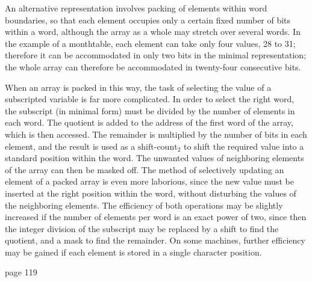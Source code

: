 An alternative representation involves packing of elements within word boundaries, so that each element occupies only a certain fixed number of bits within a word, although the array as a whole may stretch over several words. In the example of a monthtable, each element can take only four values, 28 to 31; therefore it can be accommodated in only two bits in the minimal representation; the whole array can therefore be accommodated in twenty-four consecutive bits.

When an array is packed in this way, the task of selecting the value of a subscripted variable is far more complicated. In order to select the right word, the subscript (in minimal form) must be divided by the number of elements in each word. The quotient is added to the address of the first word of the array, which is then accessed. The remainder is multiplied by the number of bits in each element, and the result is used as a $\text{shift-count}_2$ to shift the required value into a standard position within the word. The unwanted values of neighboring elements of the array can then be masked off. The method of selectively updating an element of a packed array is even more laborious, since the new value must be inserted at the right position within the word, without disturbing the values of the neighboring elements. The efficiency of both operations may be slightly increased if the number of elements per word is an exact power of two, since then the integer division of the subscript may be replaced by a shift to find the quotient, and a mask to find the remainder. On some machines, further efficiency may be gained if each element is stored in a single character position.

page 119